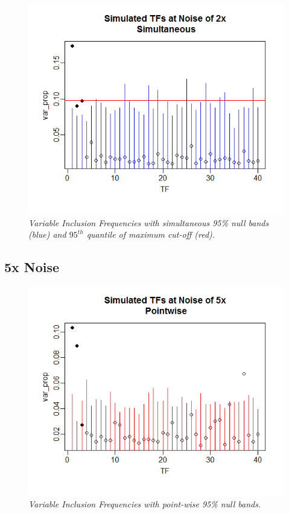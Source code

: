 \documentclass[12pt]{article}
\begin{document}
\begin{figure}[H]
\centerline{\includegraphics[scale=.5]{noise2s}}
\caption{\it Variable Inclusion Frequencies with simultaneous 95\% null bands (blue) and $95^{th}$ quantile of maximum cut-off (red).}
\end{figure}


\subsection*{5x Noise}
\begin{figure}[H]
\centerline{\includegraphics[scale=.5]{noise5p}}
\caption{\it Variable Inclusion Frequencies with point-wise 95\% null bands.}\label{fig:f1}  
\end{figure}
\end{document}
